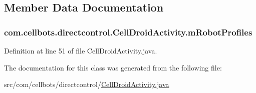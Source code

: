 \subsection{Member Data Documentation}
\hypertarget{classcom_1_1cellbots_1_1directcontrol_1_1_cell_droid_activity_a24ead98c88dbca3df6d4b280740cd7f1}{
\subsubsection[{m\-Robot\-Profiles}]{ {\bf com.\-cellbots.\-directcontrol.\-Cell\-Droid\-Activity.\-m\-Robot\-Profiles}}}\label{classcom_1_1cellbots_1_1directcontrol_1_1_cell_droid_activity_a24ead98c88dbca3df6d4b280740cd7f1}


Definition at line 51 of file Cell\-Droid\-Activity.\-java.



The documentation for this class was generated from the following file\-:\begin{DoxyCompactItemize}
\item 
src/com/cellbots/directcontrol/\hyperlink{directcontrol_2_cell_droid_activity_8java}{Cell\-Droid\-Activity.\-java}\end{DoxyCompactItemize}
